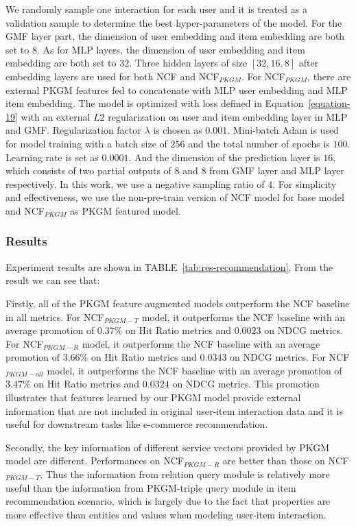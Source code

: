We randomly sample one interaction for each user and it is treated as a validation sample to determine the best hyper-parameters of the model. For the GMF layer part, the dimension of user embedding and item embedding are both set to $8$. As for MLP layers, the dimension of user embedding and item embedding are both set to $32$. Three hidden layers of size $[32, 16, 8]$ after embedding layers are used for both NCF and NCF$_{PKGM}$. For NCF$_{PKGM}$, there are external PKGM features fed to concatenate with MLP user embedding and MLP item embedding. The model is optimized with loss defined in Equation~\eqref{equation-19} with an external $L2$ regularization on user and item embedding layer in MLP and GMF. Regularization factor $\lambda$ is chosen as 0.001. Mini-batch Adam\cite{adam} is used for model training with a batch size of $256$ and the total number of epochs is $100$. Learning rate is set as $0.0001$. And the dimension of the prediction layer is $16$, which consists of two partial outputs of $8$ and $8$ from GMF layer and MLP layer respectively. In this work, we use a negative sampling ratio of $4$. For simplicity and effectiveness, we use the non-pre-train version of NCF model for base model and NCF$_{PKGM}$ as PKGM featured model.
\subsubsection{Results}

Experiment results are shown in TABLE~\ref{tab:res-recommendation}. 
From the result we can see that:

Firstly, all of the PKGM feature augmented models outperform the NCF baseline in all metrics. For NCF$_{PKGM-T}$ model, it outperforms the NCF baseline with an average promotion of $0.37\%$ on Hit Ratio metrics and $0.0023$ on NDCG metrics. For NCF$_{PKGM-R}$ model, it outperforms the NCF baseline with an average promotion of $3.66\%$ on Hit Ratio metrics and $0.0343$ on NDCG metrics.
For NCF$_{PKGM-all}$ model, it outperforms the NCF baseline with an average promotion of $3.47\%$ on Hit Ratio metrics and $0.0324$ on NDCG metrics. This promotion illustrates that features learned by our PKGM model provide external information that are not included in original user-item interaction data and it is useful for downstream tasks like e-commerce recommendation.

Secondly, the key information of different service vectors provided by PKGM model are different. Performances on NCF$_{PKGM-R}$ are better than those on NCF$_{PKGM-T}$. Thus the information from relation query module is relatively more useful than the information from PKGM-triple query module in item recommendation scenario, which is largely due to the fact that properties are more effective than entities and values when modeling user-item interaction.